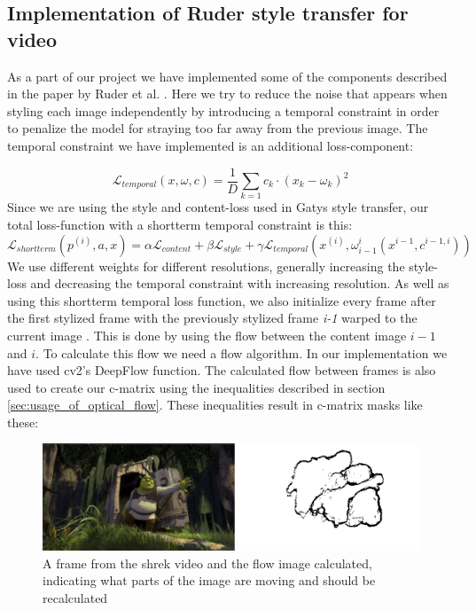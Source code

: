 \subsection{Implementation of Ruder style transfer for video}
\label{sec:Ruder style transfer}
As a part of our project we have implemented some of the components described in the paper by Ruder et al. \cite{Ruder:1}. Here we try to reduce the noise that appears when styling each image independently by introducing a temporal constraint in order to penalize the model for straying too far away from the previous image.\newline\newline
The temporal constraint we have implemented is an additional loss-component: \newline

\begin{equation}
\mathcal{L}_{temporal}(x, \omega, c) = \frac{1}{D}\sum_{k=1} c_k \cdot (x_k - \omega_k)^2
\end{equation}
Since we are using the style and content-loss used in Gatys style transfer, our total loss-function with a shortterm temporal constraint is this:\newline
\begin{equation}
\mathcal{L}_{shortterm}(p^{(i)}, a, x) = \alpha \mathcal{L}_{content} + \beta \mathcal{L}_{style} + \gamma \mathcal{L}_{temporal}(x^{(i)}, \omega_{i-1}^i(x^{i-1}, c^{i-1, i}))
\end{equation}
We use different weights for different resolutions, generally increasing the style-loss and decreasing the temporal constraint with increasing resolution.\newline
As well as using this shortterm temporal loss function, we also initialize every frame after the first stylized frame with the previously stylized frame \textit{i-1} warped to the current image . This is done by using the flow between the content image $i-1$ and $i$. 
To calculate this flow we need a flow algorithm. In our implementation we have used cv2's DeepFlow function. The calculated flow between frames is also used to create our c-matrix using the inequalities described in section \ref{sec:usage_of_optical_flow}. These inequalities result in c-matrix masks like these:\newline 
\begin{figure}[!ht]
\begin{center}
\includegraphics[scale=0.5]{report/Method/images/shrek_flow.png}
\caption{A frame from the shrek video and the flow image calculated, indicating what parts of the image are moving and should be recalculated}
\label{fig:architecture}
\end{center}
\end{figure}
